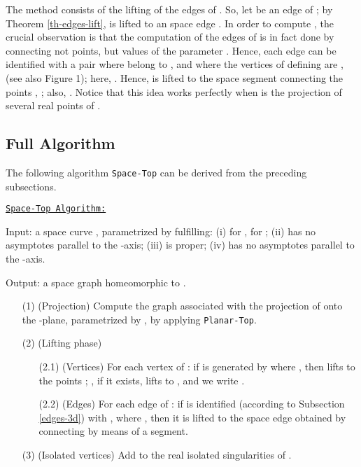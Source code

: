 \documentclass{elsart}
\begin{document}
The method consists of the lifting of the edges of
. So, let  be an edge of
; by Theorem \ref{th-edges-lift},  is
lifted to an space edge . In order to
compute , the crucial observation is that the computation
of the edges of  is in fact done by
connecting not points, but values of the parameter . Hence,
each edge  can be identified with a pair 
where  belong to , and where the vertices of
 defining  are ,
 (see also Figure 1); here,
. Hence,  is lifted to the
space segment connecting the points ,
; also, . Notice that this idea works perfectly when 
is the projection of several real points of .














\subsection{Full Algorithm}

The following algorithm {\tt Space-Top} can be derived from the preceding subsections.

\underline{\tt Space-Top Algorithm:}

{\sf Input:} a space curve , parametrized by 
fulfilling: (i)  for ,  for ; (ii)  has no asymptotes parallel to the -axis; (iii)  is proper; (iv)  has no asymptotes parallel to the -axis.

{\sf Output:}  a space graph  homeomorphic to .

\begin{itemize}
\item [(1)] (Projection) Compute the graph  associated with the projection  of  onto the -plane, parametrized by , by applying {\tt Planar-Top}.
    \item [(2)] (Lifting phase)
    \begin{itemize}
    \item [(2.1)] (Vertices) For each vertex of : if  is generated by  where , then  lifts to the points ;  , if it exists, lifts to , and we write .
        \item [(2.2)] (Edges) For each edge of : if  is identified (according to Subsection \ref{edges-3d}) with , where , then it is lifted to the space edge obtained by connecting  by means of a segment.
            \end{itemize}
    \item [(3)] (Isolated vertices) Add to  the real isolated singularities of .
    \end{itemize}
\end{document}
